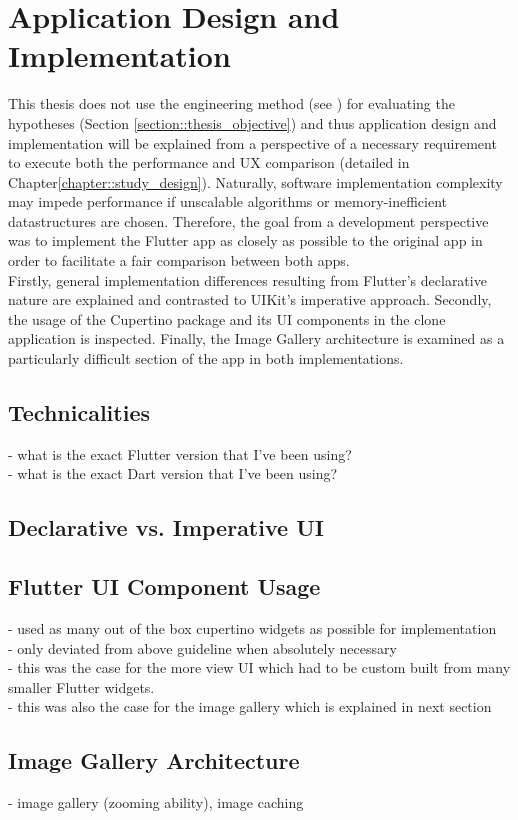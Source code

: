 \chapter{Application Design and Implementation} \label{chapter::implementation}
This thesis does not use the engineering method (see \cite{Ertas1996}) for evaluating the hypotheses (Section \ref{section::thesis_objective}) and thus application design and implementation will be explained from a perspective of
a necessary requirement to execute both the performance and UX comparison (detailed in Chapter\ref{chapter::study_design}).
Naturally, software implementation complexity may impede performance if unscalable algorithms or memory-inefficient datastructures are chosen.
Therefore, the goal from a development perspective was to implement the Flutter app as closely as possible to the original app in order to facilitate a fair comparison between both apps.\\
Firstly, general implementation differences resulting from Flutter's declarative nature are explained and contrasted to UIKit's imperative approach.
Secondly, the usage of the Cupertino package and its UI components in the clone application is inspected. 
Finally, the Image Gallery architecture is examined as a particularly difficult section of the app in both implementations.\\


\section{Technicalities}
- what is the exact Flutter version that I've been using?\\
- what is the exact Dart version that I've been using?

\section{Declarative vs. Imperative UI}


\section{Flutter UI Component Usage}
- used as many out of the box cupertino widgets as possible for implementation\\
- only deviated from above guideline when absolutely necessary\\
    - this was the case for the more view UI which had to be custom built from many smaller Flutter widgets.\\
    - this was also the case for the image gallery which is explained in next section


\section{Image Gallery Architecture}
- image gallery (zooming ability), image caching

